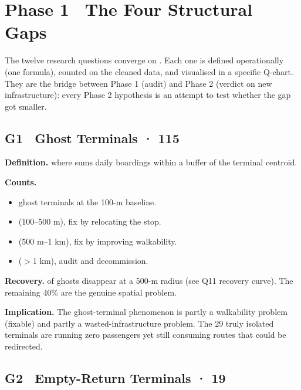 
\section{Phase 1 \textbullet\ The Four Structural Gaps}
\label{sec:phase1-gaps}

The twelve research questions converge on .
Each one is defined operationally (one formula), counted on the cleaned
data, and visualised in a specific Q-chart. They are the bridge between
Phase 1 (audit) and Phase 2 (verdict on new infrastructure): every Phase
2 hypothesis is an attempt to test whether the gap got smaller.

\subsection{G1 \textbullet\ Ghost Terminals · 115}

\textbf{Definition.}
where  sums daily boardings within a
 buffer of the terminal centroid.

\textbf{Counts.}
\begin{itemize}
 \item {} ghost terminals at the 100-m baseline.
 \item {}  (100--500 m), fix by relocating the stop.
 \item {}  (500 m--1 km), fix by improving
 walkability.
 \item {}  ($>$1 km), audit and decommission.
\end{itemize}

\textbf{Recovery.}  of ghosts disappear at a 500-m radius
(see Q11 recovery curve). The remaining 40\% are the genuine spatial
problem.

\textbf{Implication.} The ghost-terminal phenomenon is partly a
walkability problem (fixable) and partly a wasted-infrastructure
problem. The 29 truly isolated terminals are running zero passengers
yet still consuming routes that could be redirected.

\subsection{G2 \textbullet\ Empty-Return Terminals · 19}

